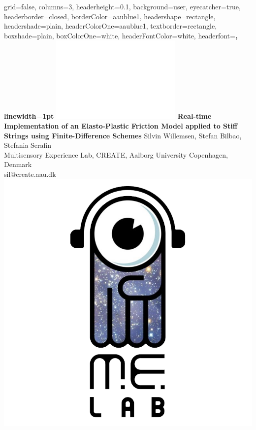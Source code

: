 \documentclass[a0paper,portrait]{baposter}
\begin{document}
\begin{poster}{
  grid=false,
  columns=3,
  headerheight=0.1\textheight,
  background=user,
  eyecatcher=true,
  headerborder=closed,
  borderColor=aaublue1,
  headershape=rectangle,
  headershade=plain,
  headerColorOne=aaublue1,
  textborder=rectangle,
  boxshade=plain,
  boxColorOne=white,
  headerFontColor=white,
  headerfont=\Large\sf\bf,
  linewidth=1pt
}
{
  \includegraphics[height=0.75\headerheight]{AAUgraphics/aau_logo_new_neg}
}
{\color{white}\bf \Large
  Real-time Implementation of an Elasto-Plastic Friction Model applied to Stiff Strings using Finite-Difference Schemes
}
{\color{white}\small
  \vspace{1em} Silvin Willemsen, Stefan Bilbao, Stefania Serafin\\[0.5em]
  Multisensory Experience Lab, CREATE, Aalborg University Copenhagen, Denmark\\
  sil@create.aau.dk
}
{
  \includegraphics[height=0.75\headerheight]{melablogo2.png}
}


\end{poster}
\end{document}
